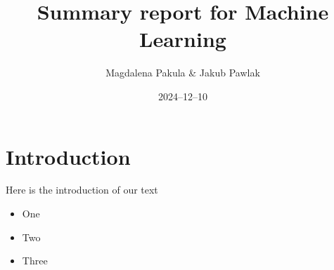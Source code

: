 \documentclass[12pt]{article}
\title{Summary report for Machine Learning}
\author{Magdalena Pakula \& Jakub Pawlak}
\date{2024–12–10}
\begin{document}
\maketitle

\section{Introduction}

Here is the introduction of our text

\begin{itemize}

\item One

\item Two

\item Three

\end{itemize}
\end{document}
